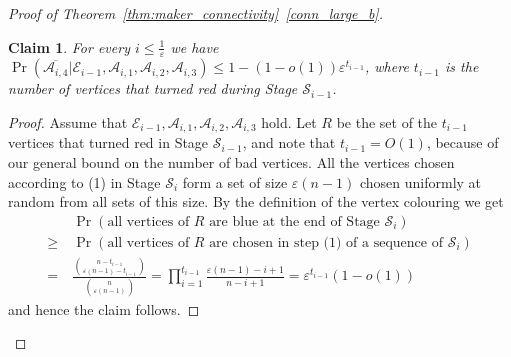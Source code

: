 \documentclass[11pt, a4paper]{article}
\numberwithin{equation}{section}
\numberwithin{figure}{section}
\newtheorem{claim}[theorem]{Claim}
\newcommand{\Prob}{\operatorname{Pr}}
\begin{document}
\begin{proof}[Proof of Theorem~\ref{thm:maker_connectivity}~\ref{conn_large_b}]
\begin{claim}
For every $i\leq \frac{1}{\varepsilon}$ we have
$\Prob(\overline{\mathcal{A}_{i,4}}|\mathcal{E}_{i-1},\mathcal{A}_{i,1},\mathcal{A}_{i,2},\mathcal{A}_{i,3})\leq 1- (1-o(1))\varepsilon^{t_{i-1}}$,
where $t_{i-1}$ is the number of vertices that turned red during Stage $\mathcal{S}_{i-1}$.
\end{claim}

\begin{proof}
Assume that $\mathcal{E}_{i-1},\mathcal{A}_{i,1},\mathcal{A}_{i,2},\mathcal{A}_{i,3}$ hold.
Let $R$ be the set of the $t_{i-1}$ vertices that turned red in Stage $\mathcal{S}_{i-1}$,
and note that $t_{i-1}=O(1)$, because of our general bound on the number of bad vertices. All the vertices chosen according to (1) in Stage $\mathcal{S}_{i}$ form a set
of size $\varepsilon(n-1)$ chosen
uniformly at random from all sets of this size.
By the definition of the vertex colouring we get 
\begin{align*}
& \Prob\left( \text{all vertices of $R$ are blue at the end of Stage $\mathcal{S}_{i}$} \right) \\
\geq ~
& \Prob\left( \text{all vertices of $R$ are chosen in step (1) of a sequence of $\mathcal{S}_{i}$} \right) \\
= ~
& \frac{\binom{n-t_{i-1}}{\varepsilon(n-1) - t_{i-1}}}{\binom{n}{\varepsilon(n-1)}}
=
\prod_{i=1}^{t_{i-1}} 
\frac{\varepsilon(n-1) - i + 1}{n - i+ 1}
=
\varepsilon^{t_{i-1}} (1-o(1))
\end{align*}
and hence the claim follows.
\end{proof}


\end{proof}
\end{document}
